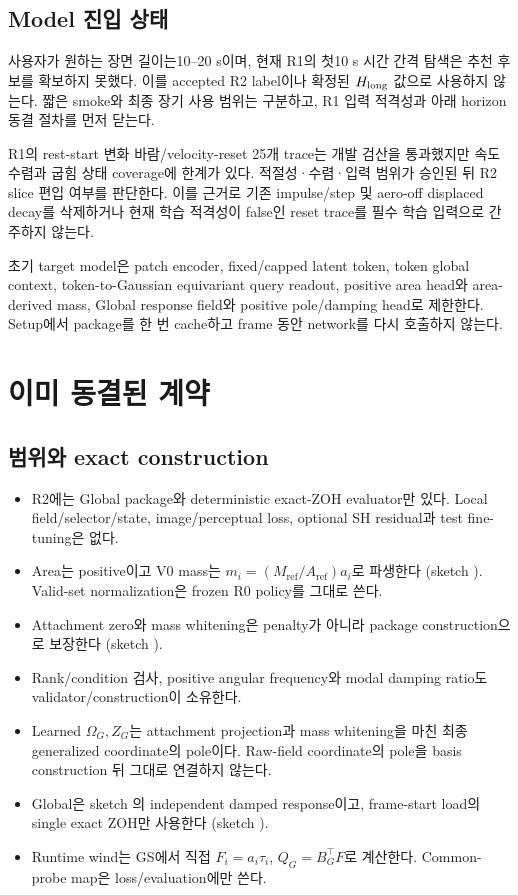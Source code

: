 \documentclass[10pt]{article}
\begin{document}
\subsection{Model 진입 상태}

사용자가 원하는 장면 길이는10--20 s이며, 현재 R1의 첫10 s 시간 간격 탐색은 추천 후보를
확보하지 못했다. 이를 accepted R2 label이나 확정된 \(H_{\rm long}\) 값으로 사용하지 않는다.
짧은 smoke와 최종 장기 사용 범위는 구분하고, R1 입력 적격성과 아래 horizon 동결 절차를 먼저 닫는다.

R1의 rest-start 변화 바람/velocity-reset 25개 trace는 개발 검산을 통과했지만 속도 수렴과 굽힘 상태
coverage에 한계가 있다. 적절성·수렴·입력 범위가 승인된 뒤
R2 slice 편입 여부를 판단한다. 이를 근거로 기존 impulse/step 및 aero-off displaced decay를 삭제하거나
현재 학습 적격성이 false인 reset trace를 필수 학습 입력으로 간주하지 않는다.

초기 target model은 patch encoder, fixed/capped latent token, token global context,
token-to-Gaussian equivariant query readout, positive area head와 area-derived mass,
Global response field와 positive pole/damping head로 제한한다. Setup에서 package를 한 번 cache하고
frame 동안 network를 다시 호출하지 않는다.

\section{이미 동결된 계약}
\label{sec:r2-chapter-3}

\subsection{범위와 exact construction}

\begin{itemize}
  \item R2에는 Global package와 deterministic exact-ZOH evaluator만 있다. Local field/selector/state,
  image/perceptual loss, optional SH residual과 test fine-tuning은 없다.
  \item Area는 positive이고 V0 mass는 \(m_i=(M_{\mathrm{ref}}/A_{\mathrm{ref}})a_i\)로 파생한다
  (sketch ). Valid-set normalization은 frozen R0 policy를 그대로 쓴다.
  \item Attachment zero와 mass whitening은 penalty가 아니라 package construction으로 보장한다
  (sketch ).
  \item Rank/condition 검사, positive angular frequency와 modal damping ratio도 validator/construction이 소유한다.
  \item Learned \(\Omega_G,Z_G\)는 attachment projection과 mass whitening을 마친 최종 generalized
  coordinate의 pole이다. Raw-field coordinate의 pole을 basis construction 뒤 그대로 연결하지 않는다.
  \item Global은 sketch 의 independent damped response이고,
  frame-start load의 single exact ZOH만 사용한다 (sketch ).
  \item Runtime wind는 GS에서 직접 \(F_i=a_i\tau_i\), \(Q_G=B_G^\top F\)로 계산한다.
  Common-probe map은 loss/evaluation에만 쓴다.
\end{itemize}
\end{document}
